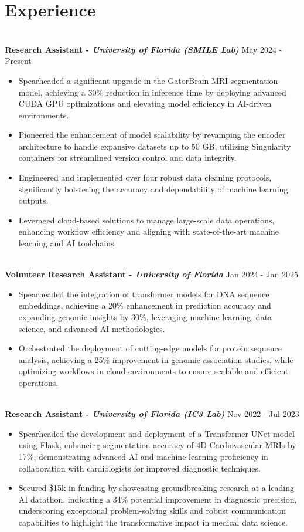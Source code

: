 \documentclass[a4paper,10pt]{article}
\begin{document}
\vspace{-10pt}
\section*{Experience}
\vspace{-3pt}
\textbf{\\ Research Assistant - \textit{University of Florida (SMILE Lab)}}  
\hfill May 2024 - Present
\begin{itemize}
\item Spearheaded a significant upgrade in the GatorBrain MRI segmentation model, achieving a 30\% reduction in inference time by deploying advanced CUDA GPU optimizations and elevating model efficiency in AI-driven environments.
\item Pioneered the enhancement of model scalability by revamping the encoder architecture to handle expansive datasets up to 50 GB, utilizing Singularity containers for streamlined version control and data integrity.
\item Engineered and implemented over four robust data cleaning protocols, significantly bolstering the accuracy and dependability of machine learning outputs.
\item Leveraged cloud-based solutions to manage large-scale data operations, enhancing workflow efficiency and aligning with state-of-the-art machine learning and AI toolchains.
\end{itemize}
\vspace{-8pt}
\textbf{\\ Volunteer Research Assistant - \textit{University of Florida}}  
\hfill Jan 2024 - Jan 2025
\begin{itemize}
\item Spearheaded the integration of transformer models for DNA sequence embeddings, achieving a 20\% enhancement in prediction accuracy and expanding genomic insights by 30\%, leveraging machine learning, data science, and advanced AI methodologies.
\item Orchestrated the deployment of cutting-edge models for protein sequence analysis, achieving a 25\% improvement in genomic association studies, while optimizing workflows in cloud environments to ensure scalable and efficient operations.
\end{itemize}
\vspace{-8pt}
\textbf{\\ Research Assistant - \textit{University of Florida (IC3 Lab)}}  
\hfill Nov 2022 - Jul 2023
\begin{itemize}
\item Spearheaded the development and deployment of a Transformer UNet model using Flask, enhancing segmentation accuracy of 4D Cardiovascular MRIs by 17\%, demonstrating advanced AI and machine learning proficiency in collaboration with cardiologists for improved diagnostic techniques.
\item Secured \$15k in funding by showcasing groundbreaking research at a leading AI datathon, indicating a 34\% potential improvement in diagnostic precision, underscoring exceptional problem-solving skills and robust communication capabilities to highlight the transformative impact in medical data science.
\end{itemize}
\end{document}
